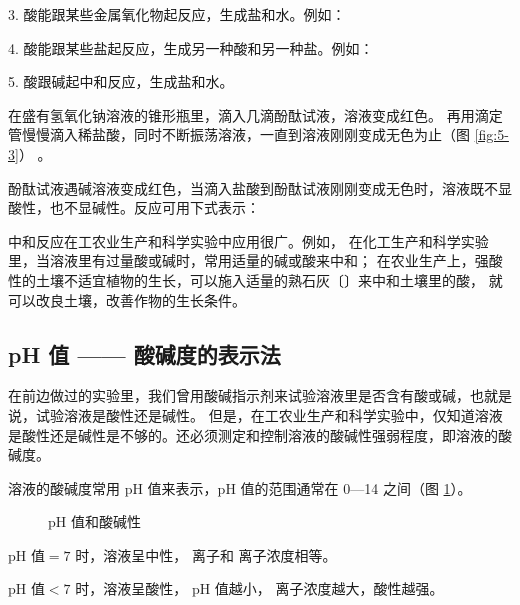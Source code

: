 3. 酸能跟某些金属氧化物起反应，生成盐和水。例如：
\begin{fangchengshi}
\end{fangchengshi}

4. 酸能跟某些盐起反应，生成另一种酸和另一种盐。例如：
\begin{fangchengshi}
\end{fangchengshi}


5. 酸跟碱起中和反应，生成盐和水。

\begin{shiyan}
    在盛有氢氧化钠溶液的锥形瓶里，滴入几滴酚酞试液，溶液变成红色。
    再用滴定管慢慢滴入稀盐酸，同时不断振荡溶液，一直到溶液刚刚变成无色为止（图 \ref{fig:5-3}） 。
\end{shiyan}

酚酞试液遇碱溶液变成红色，当滴入盐酸到酚酞试液刚刚变成无色时，溶液既不显酸性，也不显碱性。反应可用下式表示：
\begin{fangchengshi}
\end{fangchengshi}


中和反应在工农业生产和科学实验中应用很广。例如，
在化工生产和科学实验里，当溶液里有过量酸或碱时，常用适量的碱或酸来中和；
在农业生产上，强酸性的土壤不适宜植物的生长，可以施入适量的熟石灰〔〕来中和土壤里的酸，
就可以改良土壤，改善作物的生长条件。


\subsection{pH 值 —— 酸碱度的表示法}

在前边做过的实验里，我们曾用酸碱指示剂来试验溶液里是否含有酸或碱，也就是说，试验溶液是酸性还是碱性。
但是，在工农业生产和科学实验中，仅知道溶液是酸性还是碱性是不够的。还必须测定和控制溶液的酸碱性强弱程度，即溶液的酸碱度。

溶液的酸碱度常用 pH 值来表示，pH 值的范围通常在 0—14 之间（图 \ref{fig:5-4}）。

\begin{figure}[htbp]
    \centering
    
    \caption{pH 值和酸碱性}\label{fig:5-4}
\end{figure}

$\text{pH 值} = 7$ 时，溶液呈中性， 离子和  离子浓度相等。

$\text{pH 值} < 7$ 时，溶液呈酸性， pH 值越小， 离子浓度越大，酸性越强。

